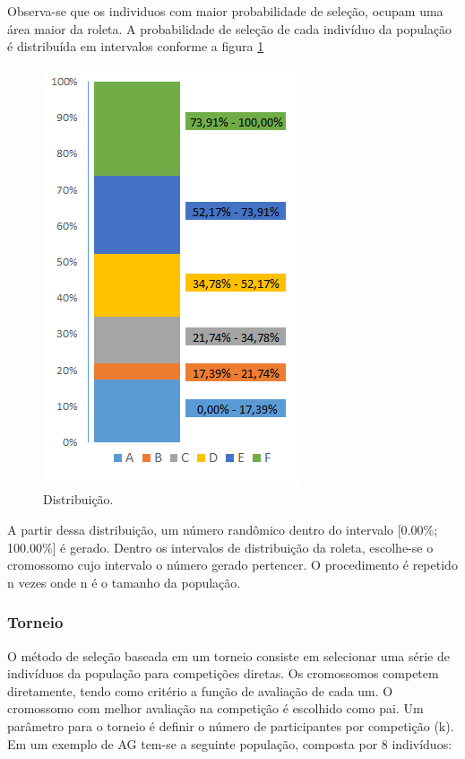 \documentclass[twoside]{article}
\begin{document}
\begin{multicols}{2}
Observa-se que os individuos com maior probabilidade de seleção, ocupam uma área maior da roleta. A probabilidade de seleção de cada indivíduo da população é distribuída em intervalos conforme a figura \ref{fig:ditrib}

\begin{figure}[H]
\label{fig:ditrib}
  \caption{Distribuição.}
  \centering
    \includegraphics[scale = 1]{roleta_dist2.png}
\end{figure}

A partir dessa distribuição, um número randômico dentro do intervalo [0.00\%; 100.00\%] é gerado. Dentro os intervalos de distribuição da roleta, escolhe-se o cromossomo cujo intervalo o número gerado pertencer. O procedimento é repetido n vezes onde n é o tamanho da população.

\subsubsection{Torneio}
O método de seleção baseada em um torneio consiste em selecionar uma série de indivíduos da população para competições diretas. Os cromossomos competem diretamente, tendo como critério a função de avaliação de cada um. O cromossomo com melhor avaliação na competição é escolhido como pai. Um parâmetro para o torneio é definir o número de participantes por competição (k).
Em um exemplo de AG tem-se a seguinte população, composta por 8 indivíduos:


\end{multicols}
\end{document}
